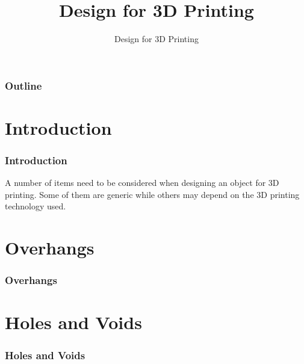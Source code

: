 \documentclass[english,10pt]{beamer}
\title{Design for 3D Printing}
\subtitle{Design for 3D Printing}
\begin{document}
\begin{frame}
  \titlepage
\end{frame}

\begin{frame}
  \frametitle{Outline}
  \tableofcontents
\end{frame}

\section{Introduction}
\begin{frame}
  \frametitle{Introduction}
  A number of items need to be considered when designing an object for 3D printing.  Some of them are generic while others may depend on the 3D printing technology used.
\end{frame}

\section{Overhangs}
\begin{frame}
  \frametitle{Overhangs}
\end{frame}

\section{Holes and Voids}
\begin{frame}
  \frametitle{Holes and Voids}
\end{frame}
\end{document}
